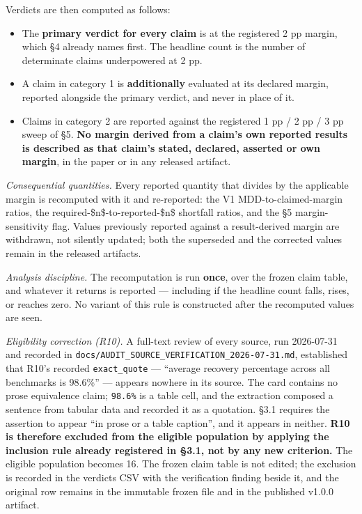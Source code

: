 Verdicts are then computed as follows:

\begin{itemize}
\item The \textbf{primary verdict for every claim} is at the registered 2 pp margin, which \S{}4 already names first. The headline count is the number of determinate claims underpowered at 2 pp.
\item A claim in category 1 is \textbf{additionally} evaluated at its declared margin, reported alongside the primary verdict, and never in place of it.
\item Claims in category 2 are reported against the registered 1 pp / 2 pp / 3 pp sweep of \S{}5. \textbf{No margin derived from a claim's own reported results is described as that claim's stated, declared, asserted or own margin}, in the paper or in any released artifact.
\end{itemize}
\emph{Consequential quantities.} Every reported quantity that divides by the applicable margin is recomputed with it and re-reported: the V1 MDD-to-claimed-margin ratios, the required-\$n\$-to-reported-\$n\$ shortfall ratios, and the \S{}5 margin-sensitivity flag. Values previously reported against a result-derived margin are withdrawn, not silently updated; both the superseded and the corrected values remain in the released artifacts.

\emph{Analysis discipline.} The recomputation is run \textbf{once}, over the frozen claim table, and whatever it returns is reported --- including if the headline count falls, rises, or reaches zero. No variant of this rule is constructed after the recomputed values are seen.

\emph{Eligibility correction (R10).} A full-text review of every source, run 2026-07-31 and recorded in \texttt{docs/\allowbreak{}AUDIT\_SOURCE\_VERIFICATION\_2026-\allowbreak{}07-\allowbreak{}31.md}, established that R10's recorded \texttt{exact\_quote} --- ``average recovery percentage across all benchmarks is 98.6\%'' --- appears nowhere in its source. The card contains no prose equivalence claim; \texttt{98.6\%} is a table cell, and the extraction composed a sentence from tabular data and recorded it as a quotation. \S{}3.1 requires the assertion to appear ``in prose or a table caption'', and it appears in neither. \textbf{R10 is therefore excluded from the eligible population by applying the inclusion rule already registered in \S{}3.1, not by any new criterion.} The eligible population becomes 16. The frozen claim table is not edited; the exclusion is recorded in the verdicts CSV with the verification finding beside it, and the original row remains in the immutable frozen file and in the published v1.0.0 artifact.

